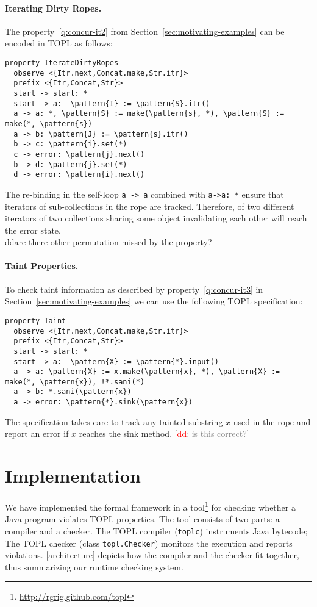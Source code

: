 \documentclass[9pt, preprint]{sigplanconf} %
\newcommand{\noterg}[2]{\textcolor{gray}{[\textcolor{red}{#1}: #2]}}
\newcommand{\dd}[1]{\noterg{dd}{#1}}
\newcommand{\delimitVerbatim}{\par\nobreak\smallskip\noindent}
\newcommand{\pattern}[1]{\ensuremath{\mathtt{\underline{#1}}}}
\theoremstyle{definition}
\theoremstyle{remark}
\begin{document}
\paragraph{Iterating Dirty Ropes.} %
The property~\eqref{q:concur-it2} from Section~\ref{sec:motivating-examples} can be encoded in TOPL as follows:
%
\delimitVerbatim
\begin{Verbatim}[commandchars=\\\{\}]
property IterateDirtyRopes
  observe <{Itr.next,Concat.make,Str.itr}>
  prefix <{Itr,Concat,Str}>
  start -> start: *
  start -> a:  \pattern{I} := \pattern{S}.itr()
  a -> a: *, \pattern{S} := make(\pattern{s}, *), \pattern{S} := make(*, \pattern{s})
  a -> b: \pattern{J} := \pattern{s}.itr()
  b -> c: \pattern{i}.set(*)
  c -> error: \pattern{j}.next()
  b -> d: \pattern{j}.set(*)
  d -> error: \pattern{i}.next()
\end{Verbatim}
\delimitVerbatim
The re-binding in the self-loop {\tt a -> a} combined with {\tt a->a: *} ensure that iterators of sub-collections in the rope are tracked. Therefore,
of two different iterators of two collections sharing some object invalidating each other will reach the error state. 
\\dd{are there other permutation missed by the property?}

\paragraph{Taint Properties.} %
To check taint information as described by property~\eqref{q:concur-it3} in Section~\ref{sec:motivating-examples} we can use the following
TOPL specification:
\delimitVerbatim
\begin{Verbatim}[commandchars=\\\{\}]
property Taint
  observe <{Itr.next,Concat.make,Str.itr}>
  prefix <{Itr,Concat,Str}>
  start -> start: *
  start -> a:  \pattern{X} := \pattern{*}.input()
  a -> a: \pattern{X} := x.make(\pattern{x}, *), \pattern{X} := make(*, \pattern{x}), !*.sani(*)
  a -> b: *.sani(\pattern{x})
  a -> error: \pattern{*}.sink(\pattern{x})
\end{Verbatim}
\delimitVerbatim
The specification takes care to track  any tainted substring $x$ used in the rope and report an error if $x$ reaches the sink method.
\dd{is this correct?}


\section{Implementation} \label{sec:implementation} %
We have implemented the formal framework in a tool\footnote{\url{http://rgrig.github.com/topl}} for checking whether a Java program violates 
TOPL properties.
The tool consists of two parts: a compiler and a checker.
The TOPL compiler ({\tt toplc}) instruments Java bytecode;
The TOPL checker (class {\tt topl.Checker}) monitors the execution and reports violations.
\autoref{architecture} depicts how the compiler and the checker fit together, thus summarizing our runtime checking system.
\end{document}
